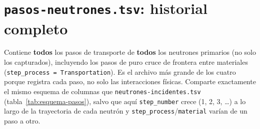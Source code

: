 \documentclass[11pt,a4paper]{article}
\newcommand{\archivo}[1]{\texttt{#1}} %
\newcommand{\var}[1]{\texttt{#1}}
\begin{document}
\section{\archivo{pasos-neutrones.tsv}: historial completo}

Contiene \textbf{todos} los pasos de transporte de \textbf{todos} los neutrones primarios (no solo
los capturados), incluyendo los pasos de puro cruce de frontera entre materiales
(\var{step\_process = Transportation}). Es el archivo más grande de los cuatro porque registra
cada paso, no solo las interacciones físicas. Comparte exactamente el mismo esquema de columnas que
\archivo{neutrones-incidentes.tsv} (tabla~\ref{tab:esquema-pasos}), salvo que aquí
\var{step\_number} crece (1, 2, 3, \ldots) a lo largo de la trayectoria de cada neutrón y
\var{step\_process}/\var{material} varían de un paso a otro.
\end{document}
